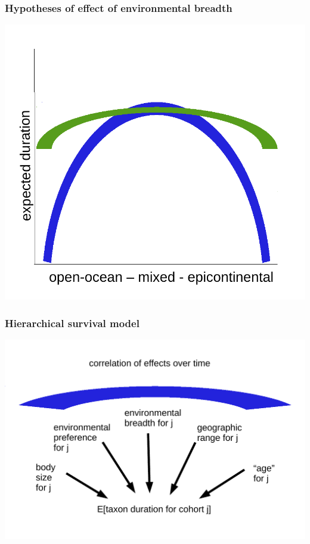 \documentclass{beamer}
\begin{document}
\begin{frame}
  \frametitle{Hypotheses of effect of environmental breadth}

  \begin{center}
    \includegraphics[width = \textwidth,height = 0.8\textheight,keepaspectratio = true]{figure/selection_breadth}
  \end{center}
\end{frame}

\begin{frame}
  \frametitle{Hierarchical survival model}
  \begin{center}
    \includegraphics[width = \textwidth,height = 0.8\textheight,keepaspectratio = true]{figure/simple_model}
  \end{center}
\end{frame}
\end{document}
